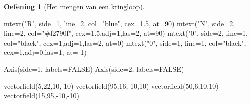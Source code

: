 \documentclass[
  a4paper,
]{scrbook}
\newenvironment{Shaded}{\begin{snugshade}}{\end{snugshade}}
\newcommand{\AttributeTok}[1]{\textcolor[rgb]{0.40,0.45,0.13}{#1}}
\newcommand{\ConstantTok}[1]{\textcolor[rgb]{0.56,0.35,0.01}{#1}}
\newcommand{\DecValTok}[1]{\textcolor[rgb]{0.68,0.00,0.00}{#1}}
\newcommand{\FloatTok}[1]{\textcolor[rgb]{0.68,0.00,0.00}{#1}}
\newcommand{\FunctionTok}[1]{\textcolor[rgb]{0.28,0.35,0.67}{#1}}
\newcommand{\NormalTok}[1]{\textcolor[rgb]{0.00,0.23,0.31}{#1}}
\newcommand{\SpecialCharTok}[1]{\textcolor[rgb]{0.37,0.37,0.37}{#1}}
\newcommand{\StringTok}[1]{\textcolor[rgb]{0.13,0.47,0.30}{#1}}
\theoremstyle{definition}
\newtheorem{exercise}{Oefening}[chapter]
\theoremstyle{remark}
\begin{document}
\begin{exercise}[Het mengen van een
kringloop]
\begin{Shaded}
\begin{Highlighting}[]
\FunctionTok{mtext}\NormalTok{(}\StringTok{"R"}\NormalTok{, }\AttributeTok{side=}\DecValTok{1}\NormalTok{, }\AttributeTok{line=}\DecValTok{2}\NormalTok{, }\AttributeTok{col=}\StringTok{"blue"}\NormalTok{, }\AttributeTok{cex=}\FloatTok{1.5}\NormalTok{, }\AttributeTok{at=}\DecValTok{90}\NormalTok{)}
\FunctionTok{mtext}\NormalTok{(}\StringTok{"N"}\NormalTok{, }\AttributeTok{side=}\DecValTok{2}\NormalTok{, }\AttributeTok{line=}\DecValTok{2}\NormalTok{, }\AttributeTok{col=}\StringTok{"\#f2790f"}\NormalTok{, }\AttributeTok{cex=}\FloatTok{1.5}\NormalTok{,}\AttributeTok{adj=}\DecValTok{1}\NormalTok{,}\AttributeTok{las=}\DecValTok{2}\NormalTok{, }\AttributeTok{at=}\DecValTok{90}\NormalTok{)}
\FunctionTok{mtext}\NormalTok{(}\StringTok{"0"}\NormalTok{, }\AttributeTok{side=}\DecValTok{2}\NormalTok{, }\AttributeTok{line=}\DecValTok{1}\NormalTok{, }\AttributeTok{col=}\StringTok{"black"}\NormalTok{, }\AttributeTok{cex=}\DecValTok{1}\NormalTok{,}\AttributeTok{adj=}\DecValTok{1}\NormalTok{,}\AttributeTok{las=}\DecValTok{2}\NormalTok{, }\AttributeTok{at=}\DecValTok{0}\NormalTok{)}
\FunctionTok{mtext}\NormalTok{(}\StringTok{"0"}\NormalTok{, }\AttributeTok{side=}\DecValTok{1}\NormalTok{, }\AttributeTok{line=}\DecValTok{1}\NormalTok{, }\AttributeTok{col=}\StringTok{"black"}\NormalTok{, }\AttributeTok{cex=}\DecValTok{1}\NormalTok{,}\AttributeTok{adj=}\DecValTok{0}\NormalTok{,}\AttributeTok{las=}\DecValTok{1}\NormalTok{, }\AttributeTok{at=}\SpecialCharTok{{-}}\DecValTok{1}\NormalTok{)}

\FunctionTok{Axis}\NormalTok{(}\AttributeTok{side=}\DecValTok{1}\NormalTok{, }\AttributeTok{labels=}\ConstantTok{FALSE}\NormalTok{)}
\FunctionTok{Axis}\NormalTok{(}\AttributeTok{side=}\DecValTok{2}\NormalTok{, }\AttributeTok{labels=}\ConstantTok{FALSE}\NormalTok{)}

\FunctionTok{vectorfield}\NormalTok{(}\DecValTok{5}\NormalTok{,}\DecValTok{22}\NormalTok{,}\DecValTok{10}\NormalTok{,}\SpecialCharTok{{-}}\DecValTok{10}\NormalTok{)}
\FunctionTok{vectorfield}\NormalTok{(}\DecValTok{95}\NormalTok{,}\DecValTok{16}\NormalTok{,}\SpecialCharTok{{-}}\DecValTok{10}\NormalTok{,}\DecValTok{10}\NormalTok{)}
\FunctionTok{vectorfield}\NormalTok{(}\DecValTok{50}\NormalTok{,}\DecValTok{6}\NormalTok{,}\DecValTok{10}\NormalTok{,}\DecValTok{10}\NormalTok{)}
\FunctionTok{vectorfield}\NormalTok{(}\DecValTok{15}\NormalTok{,}\DecValTok{95}\NormalTok{,}\SpecialCharTok{{-}}\DecValTok{10}\NormalTok{,}\SpecialCharTok{{-}}\DecValTok{10}\NormalTok{)}


\end{Highlighting}
\end{Shaded}
\end{exercise}
\end{document}
